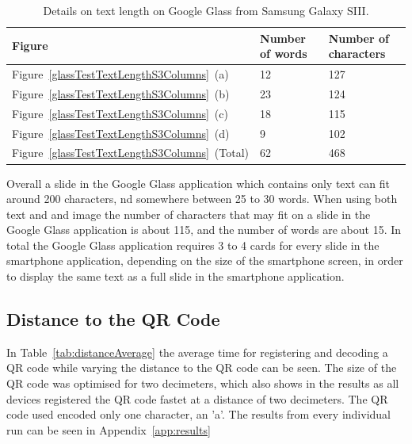 	\begin{table}[ht!]
    		\caption{Details on text length on Google Glass from Samsung Galaxy SIII.} \label{tab:glassTestTextLengthS3ColumnsTable}
		\centering \begin{tabularx}{\textwidth}{l|X|X} \hline
		\textbf{Figure} & \textbf{Number of words} & \textbf{Number of characters} \\ \hline \hline
       
		Figure~\ref{glassTestTextLengthS3Columns}~(a)	&12	&127	\\ \hline
		Figure~\ref{glassTestTextLengthS3Columns}~(b)	&23	&124	\\ \hline
		Figure~\ref{glassTestTextLengthS3Columns}~(c)	&18	&115	\\ \hline
		Figure~\ref{glassTestTextLengthS3Columns}~(d)	&9	&102	\\ \hline
		Figure~\ref{glassTestTextLengthS3Columns}~(Total)	&62	&468	\\ \hline
		
		\end{tabularx}
	\end{table}

Overall a slide in the Google Glass application which contains only text can fit around 200 characters, nd somewhere between 25 to 30 words. When using both text and and image the number of characters that may fit on a slide in the Google Glass application is about 115, and the number of words are about 15. In total the Google Glass application requires 3 to 4 cards for every slide in the smartphone application, depending on the size of the smartphone screen, in order to display the same text as a full slide in the smartphone application.

\subsection{Distance to the QR Code}

In Table~\ref{tab:distanceAverage} the average time for registering and decoding a QR code while varying the distance to the QR code can be seen. The size of the QR code was optimised for two decimeters, which also shows in the results as all devices registered the QR code fastet at a distance of two decimeters. The QR code used encoded only one character, an 'a'. The results from every individual run can be seen in Appendix~\ref{app:results}


